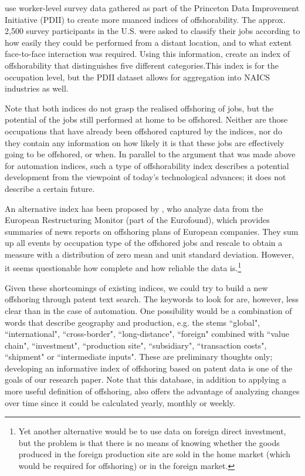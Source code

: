 \documentclass[11pt,a4paper]{article}
\begin{document}
\cite{BK2013} use worker-level survey data gathered as part of the Princeton Data Improvement Initiative (PDII) to create more nuanced indices of offshorability. The approx. 2,500 survey participants in the U.S. were asked to classify their jobs according to how easily they could be performed from a distant location, and to what extent face-to-face interaction was required. Using this information, \cite{BK2013} create an index of offshorability that distinguishes five different categories.This index is for the occupation level, but the PDII dataset allows for aggregation into NAICS industries as well. 

Note that both indices do not grasp the realised offshoring of jobs, but the potential of the jobs still performed at home to be offshored. Neither are those occupations that have already been offshored captured by the indices, nor do they contain any information on how likely it is that these jobs are effectively going to be offshored, or when. In parallel to the argument that was made above for automation indices, such a type of offshorability index describes a potential development from the viewpoint of today's technological advances; it does not describe a certain future.

An alternative index has been proposed by \cite{GMS2014}, who analyze data from the European Restructuring Monitor (part of the Eurofound), which provides summaries of news reports on offshoring plans of European companies. They sum up all events by occupation type of the offshored jobs and rescale to obtain a measure with a distribution of zero mean and unit standard deviation. However, it seems questionable how complete and how reliable the data is.\footnote{Yet another alternative would be to use data on foreign direct investment, but the problem is that there is no means of knowing whether the goods produced in the foreign production site are sold in the home market (which would be required for offshoring) or in the foreign market.}

Given these shortcomings of existing indices, we could try to build a new offshoring through patent text search. The keywords to look for are, however, less clear than in the case of automation. One possibility would be a combination of words that describe geography and production, e.g. the stems ``global", ``international", ``cross-border", ``long-distance", ``foreign" combined with ``value chain", ``investment", ``production site", ``subsidiary", ``transaction costs", ``shipment" or ``intermediate inputs". These are preliminary thoughts only; developing an informative index of offshoring based on patent data is one of the goals of our research paper. Note that this database, in addition to applying a more useful definition of offshoring, also offers the advantage of analyzing changes over time since it could be calculated yearly, monthly or weekly.
\end{document}
